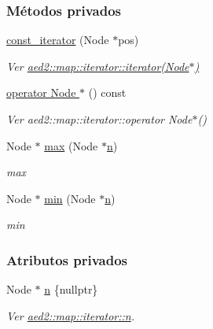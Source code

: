 \subsubsection*{Métodos privados}
\begin{DoxyCompactItemize}
\item 
\hyperlink{classaed2_1_1map_1_1const__iterator_a195d395708167dca23f9ce49f7c604f3_a195d395708167dca23f9ce49f7c604f3}{const\+\_\+iterator} (Node $\ast$pos)
\begin{DoxyCompactList}\small\item\em Ver \hyperlink{classaed2_1_1map_1_1iterator_ab0ea21abcb32b6d5a72cf341b9029838_ab0ea21abcb32b6d5a72cf341b9029838}{aed2\+::map\+::iterator\+::iterator(\+Node$\ast$)} \end{DoxyCompactList}\item 
\hyperlink{classaed2_1_1map_1_1const__iterator_a637c0f083a23ec4a262d47baeecafcf3_a637c0f083a23ec4a262d47baeecafcf3}{operator Node $\ast$} () const 
\begin{DoxyCompactList}\small\item\em Ver aed2\+::map\+::iterator\+::operator Node$\ast$() \end{DoxyCompactList}\item 
Node $\ast$ \hyperlink{classaed2_1_1map_1_1const__iterator_a586e4f750b558d2b56e0f0c47c344480_a586e4f750b558d2b56e0f0c47c344480}{max} (Node $\ast$\hyperlink{classaed2_1_1map_1_1const__iterator_a921e123f9c7f94610cf9fee3ab55d277_a921e123f9c7f94610cf9fee3ab55d277}{n})
\begin{DoxyCompactList}\small\item\em max \end{DoxyCompactList}\item 
Node $\ast$ \hyperlink{classaed2_1_1map_1_1const__iterator_ab859853ddcf99eb46918892f756cb6ba_ab859853ddcf99eb46918892f756cb6ba}{min} (Node $\ast$\hyperlink{classaed2_1_1map_1_1const__iterator_a921e123f9c7f94610cf9fee3ab55d277_a921e123f9c7f94610cf9fee3ab55d277}{n})
\begin{DoxyCompactList}\small\item\em min \end{DoxyCompactList}\end{DoxyCompactItemize}
\subsubsection*{Atributos privados}
\begin{DoxyCompactItemize}
\item 
Node $\ast$ \hyperlink{classaed2_1_1map_1_1const__iterator_a921e123f9c7f94610cf9fee3ab55d277_a921e123f9c7f94610cf9fee3ab55d277}{n} \{nullptr\}
\begin{DoxyCompactList}\small\item\em Ver \hyperlink{classaed2_1_1map_1_1iterator_adf8633ef71bb6c1fc01c0abe8728fd93_adf8633ef71bb6c1fc01c0abe8728fd93}{aed2\+::map\+::iterator\+::n}. \end{DoxyCompactList}\end{DoxyCompactItemize}


